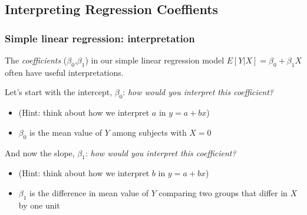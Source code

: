 \documentclass[12pt, 
hyperref={colorlinks=true, linkcolor=blue, urlcolor=cyan},dvipsnames]{beamer}
\begin{document}
\subsection{Interpreting Regression Coeffients}
\begin{frame}
\frametitle{Simple linear regression: interpretation}

The \textit{coefficients} ($\beta_0$,$\beta_1$) in our simple linear regression model $E[Y|X] = \beta_0 + \beta_1 X$ often have useful interpretations.

Let's start with the intercept, $\beta_0$: \textit{how would you interpret this coefficient?} \vspace{-0.3cm}
\begin{itemize}
\item[] (Hint: think about how we interpret $a$ in $y=a+bx$)\pause 
\item[] \color{blue} $\beta_0$ is the mean value of $Y$ among subjects with $X = 0$ \color{black}
\end{itemize}

And now the slope, $\beta_1$: \textit{how would you interpret this coefficient?} \vspace{-0.3cm}
\begin{itemize}
\item[] (Hint: think about how we interpret $b$ in $y=a+bx$) \pause
\item[] \color{blue} $\beta_1$ is the difference in mean value of $Y$ comparing two groups that differ in $X$ by one unit \color{black}
\end{itemize}

\end{frame}
\end{document}
